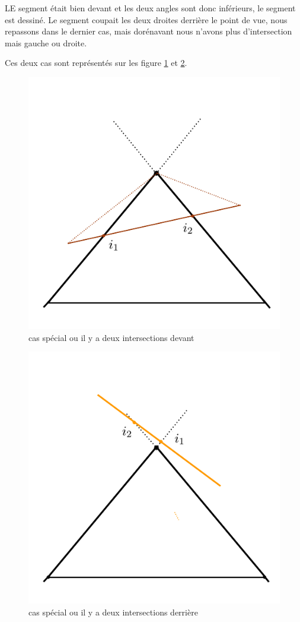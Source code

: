\documentclass[11pt,a4paper]{article}
\theoremstyle{definition}
\theoremstyle{remark}
\begin{document}
LE segment était bien devant et les deux angles sont donc inférieurs, le segment est dessiné.
Le segment coupait les deux droites derrière le point de vue, nous repassons dans le dernier cas, mais dorénavant nous n'avons plus d'intersection mais gauche ou droite.

Ces deux cas sont représentés sur les figure \ref{exp_5} et \ref{exp_6}.

\begin{figure}[H]
\centering
\includegraphics[scale=0.5]{casSpecial2.png}
\caption{cas spécial ou il y a deux intersections devant}
\label{exp_5}
\end{figure}

\begin{figure}[!h]
\centering
\includegraphics[scale=0.5]{casSpecial3.png}
\caption{cas spécial ou il y a deux intersections derrière}
\label{exp_6}
\end{figure}
\end{document}
